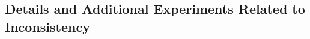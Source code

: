 \documentclass[mnsc,blindrev]{informs3}
\begin{document}
    
    
                

    
    
    
    
    \subsection{Details and Additional Experiments Related to Inconsistency}
        \label{sec:appendix_inconsistency}
\end{document}
